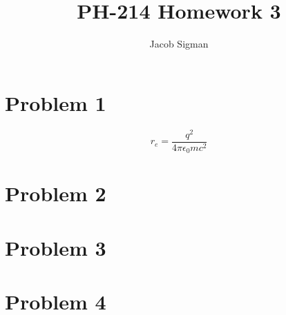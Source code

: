 \documentclass{article}
\title{PH-214 Homework 3}
\author{Jacob Sigman}
\date{}
\begin{document}
\maketitle
\section*{Problem 1}
\[r_e=\frac{q^2}{4\pi\epsilon_0mc^2}\]
\section*{Problem 2}

\section*{Problem 3}

\section*{Problem 4}
\end{document}
